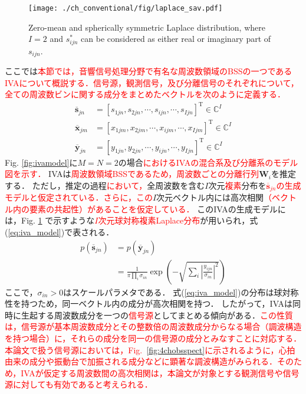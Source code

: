 \begin{figure}[t]
\centering
\texttt{[image: ./ch\_conventional/fig/laplace\_sav.pdf]}
\caption{Zero-mean and spherically symmetric Laplace distribution, where $I=2$ and $s^*_{ijn}$ can be considered as either real or imaginary part of $s_{ijn}$.}
\label{fig:laplace}
\end{figure}
ここでは\textcolor{red}{本節では，音響信号処理分野で有名な周波数領域のBSSの一つであるIVAについて概説する．信号源，観測信号，及び分離信号のそれぞれについて，全ての周波数ビンに関する成分をまとめたベクトルを次のように定義する．}
\begin{align}
    \overline{\bm{s}}_{jn} &= [s_{1jn}, s_{2jn}, \cdots, s_{ijn}, \cdots, s_{Ijn} ]^{\mathrm{T}} \in \mathbb{C}^{I} \\
    \overline{\bm{x}}_{jm} &= [x_{1jm}, x_{2jm}, \cdots, x_{ijm}, \cdots, x_{Ijm} ]^{\mathrm{T}} \in \mathbb{C}^{I} \\
    \overline{\bm{y}}_{jn} &= [y_{1jn}, y_{2jn}, \cdots, y_{ijn}, \cdots, y_{Ijn} ]^{\mathrm{T}} \in \mathbb{C}^{I}
\end{align}
Fig. \ref{fig:ivamodel}に$M=N=2$の場合\textcolor{red}{におけるIVAの混合系及び分離系のモデル図を示す．}
IVAは\textcolor{red}{周波数領域BSSであるため，周波数ごとの分離行列}$\bm{W}_i$を推定する．
ただし，推定の過程\textcolor{red}{において，}全周波数を含む$I$次元\textcolor{red}{複素}分布を\textcolor{red}{$\overline{\bm{s}}_{jn}$の生成モデルと仮定されている．さらに，この}$I$次元ベクトル内には高次相関\textcolor{red}{（ベクトル内の要素の共起性）があることを仮定している．}
このIVAの生成モデルには，Fig. \ref{fig:laplace} で示すような\textcolor{red}{$I$次元球対称複素Laplace分布}が用いられ，式(\ref{eq:iva_model})で表される．
\begin{align}
  \nonumber p(\overline{\bm{s}}_{jn}) &= p(\overline{\bm{y}}_{jn}) \\
&= \frac{1}{\pi \prod_{i} \sigma_{in}} \exp \left(  - \sqrt{ \sum_i \left| \frac{y_{ijn}}{\sigma_{in}} \right|^2}  \right)
\label{eq:iva_model}    
\end{align}
ここで，$\sigma_{in}>0$はスケールパラメタである．
式(\ref{eq:iva_model})の分布は球対称性を持つため，同一ベクトル内の成分が高次相関を持つ．
したがって，IVAは同時に生起する周波数成分を一つの\textcolor{red}{信号源}としてまとめる傾向がある．\textcolor{red}{この性質は，信号源が基本周波数成分とその整数倍の周波数成分からなる場合（調波構造を持つ場合）に，それらの成分を同一の信号源の成分とみなすことに対応する．本論文で扱う信号源においては，Fig.~\ref{fig:4chobsspect}に示されるように，心拍由来の成分や振動台で加振される成分などに顕著な調波構造がみられる．そのため，IVAが仮定する周波数間の高次相関は，本論文が対象とする観測信号や信号源に対しても有効であると考えられる．}

